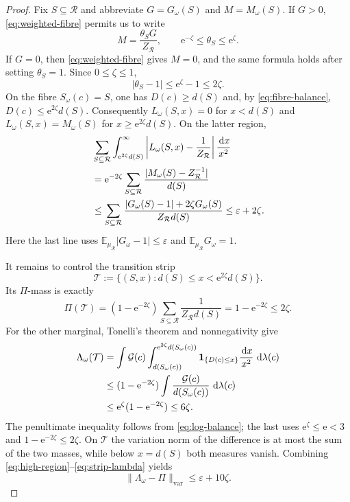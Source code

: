 \documentclass[11pt]{article}
\numberwithin{equation}{section}
\theoremstyle{plain}
\newcommand{\E}{\mathbb E}
\newcommand{\1}{\mathbf 1}
\newcommand{\dd}{\,\mathrm d}
\newcommand{\e}{\mathrm e}
\newcommand{\eps}{\varepsilon}
\newcommand{\cR}{\mathcal R}
\begin{document}
\begin{proof}
Fix $S\subseteq\cR$ and abbreviate
$G=G_\omega(S)$ and $M=M_\omega(S)$.  If $G>0$,
\eqref{eq:weighted-fibre} permits us to write
\[
 M=\frac{\theta_SG}{Z_{\cR}},
 \qquad \e^{-\zeta}\le\theta_S\le\e^\zeta.
\]
If $G=0$, then \eqref{eq:weighted-fibre} gives $M=0$, and the same formula
holds after setting $\theta_S=1$.  Since $0\le\zeta\le1$,
\[
 |\theta_S-1|\le\e^\zeta-1\le2\zeta.
\]
On the fibre $S_\omega(c)=S$, one has $D(c)\ge d(S)$ and, by
\eqref{eq:fibre-balance}, $D(c)\le\e^{2\zeta}d(S)$.  Consequently
$L_\omega(S,x)=0$ for $x<d(S)$ and
$L_\omega(S,x)=M_\omega(S)$ for $x\ge\e^{2\zeta}d(S)$.  On the latter
region,
\begin{align}
 &\sum_{S\subseteq\cR}
 \int_{\e^{2\zeta}d(S)}^\infty
 \left|L_\omega(S,x)-\frac1{Z_{\cR}}\right|
 \frac{\dd x}{x^2}\notag\\
 &=\e^{-2\zeta}\sum_{S\subseteq\cR}
 \frac{|M_\omega(S)-Z_{\cR}^{-1}|}{d(S)}\notag\\
 &\le
 \sum_{S\subseteq\cR}
 \frac{|G_\omega(S)-1|+2\zeta G_\omega(S)}
      {Z_{\cR}d(S)}
 \le\eps+2\zeta.                                  \label{eq:high-region}
\end{align}
Here the last line uses
$\E_{\mu_{\cR}}|G_\omega-1|\le\eps$ and
$\E_{\mu_{\cR}}G_\omega=1$.

It remains to control the transition strip
\[
 \mathcal T:=\{(S,x):d(S)\le x<\e^{2\zeta}d(S)\}.
\]
Its $\Pi$-mass is exactly
\begin{equation}\label{eq:strip-pi}
 \Pi(\mathcal T)
 =(1-\e^{-2\zeta})
 \sum_{S\subseteq\cR}\frac1{Z_{\cR}d(S)}
 =1-\e^{-2\zeta}\le2\zeta.
\end{equation}
For the other marginal, Tonelli's theorem and nonnegativity give
\begin{align}
 \Lambda_\omega(\mathcal T)
 &=\int \mathcal G(c)
   \int_{d(S_\omega(c))}^{\e^{2\zeta}d(S_\omega(c))}
   \1_{\{D(c)\le x\}}\frac{\dd x}{x^2}\,\dd\lambda(c)\notag\\
 &\le(1-\e^{-2\zeta})
   \int\frac{\mathcal G(c)}{d(S_\omega(c))}\,\dd\lambda(c)\notag\\
 &\le\e^\zeta(1-\e^{-2\zeta})
 \le6\zeta.                                      \label{eq:strip-lambda}
\end{align}
The penultimate inequality follows from \eqref{eq:log-balance}; the last
uses $\e^\zeta\le\e<3$ and
$1-\e^{-2\zeta}\le2\zeta$.  On $\mathcal T$ the variation norm of the
difference is at most the sum of the two masses, while below $x=d(S)$
both measures vanish.  Combining
\eqref{eq:high-region}--\eqref{eq:strip-lambda} yields
\begin{equation}\label{eq:unnormalized-prefix-TV}
 \|\Lambda_\omega-\Pi\|_{\mathrm{var}}
 \le\eps+10\zeta.
\end{equation}


\end{proof}
\end{document}

